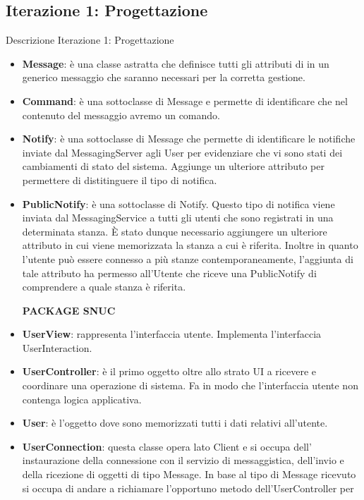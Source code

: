 \subsection{Iterazione 1: Progettazione}
\begin{frame} [allowframebreaks] {Descrizione Iterazione 1: Progettazione}
  \begin{itemize}
   \centerline{\textbf{PACKAGE COMMON}}
   \item \textbf{Message}: è una classe astratta che definisce tutti gli attributi di in un generico messaggio che saranno necessari per la corretta gestione.
   \item \textbf{Command}: è una sottoclasse di Message e permette di identificare che nel contenuto del messaggio avremo un comando.
   \item \textbf{Notify}: è una sottoclasse di Message che permette di identificare le notifiche inviate dal MessagingServer agli User per evidenziare che vi sono 
          stati dei cambiamenti di stato del sistema. Aggiunge un ulteriore attributo per permettere di distitinguere il tipo di notifica.
   \item \textbf{PublicNotify}: è una sottoclasse di Notify. Questo tipo di notifica viene inviata dal MessagingService a tutti gli utenti che sono registrati in una 
         determinata stanza. È stato dunque necessario aggiungere un ulteriore attributo in cui viene memorizzata la stanza a cui è riferita. Inoltre in quanto 
         l'utente può essere connesso a più stanze contemporaneamente, l'aggiunta di tale attributo ha permesso all'Utente che riceve una PublicNotify di comprendere 
         a quale stanza è riferita.
   \newline
   \centerline{\textbf{PACKAGE SNUC}}
   \item \textbf{UserView}: rappresenta l'interfaccia utente. Implementa l'interfaccia UserInteraction.
   \item \textbf{UserController}: è il primo oggetto oltre allo strato UI a ricevere e coordinare una operazione di sistema. Fa in modo che l'interfaccia utente non 
         contenga logica applicativa.
   \item \textbf{User}: è l'oggetto dove sono memorizzati tutti i dati relativi all'utente.
   \item \textbf{UserConnection}: questa classe opera lato Client e si occupa dell' instaurazione della connessione con il servizio di messaggistica, dell'invio e 
         della ricezione di oggetti di tipo Message. In base al tipo di Message ricevuto si occupa di andare a richiamare l'opportuno metodo dell'UserController per 

\end{itemize}
\end{frame}
